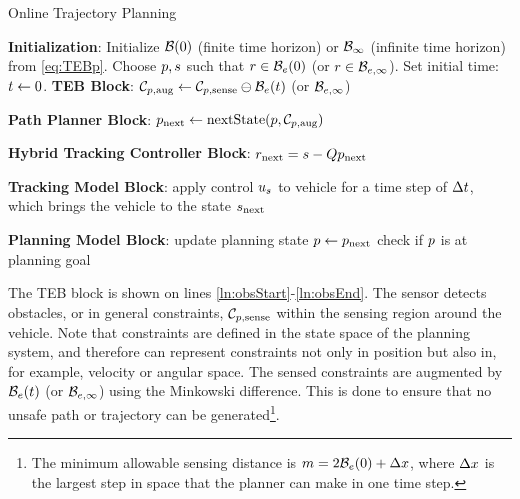 \begin{algorithm}	
	\caption{Online Trajectory Planning}
	\label{alg:algOnline}
	\begin{algorithmic}[1]
		\STATE \textbf{Initialization}: \label{ln:Istart}
 		\STATE Initialize $\mathcal B(0)$ (finite time horizon) or $\mathcal B_\infty$ (infinite time horizon) from \eqref{eq:TEBp}. 
		\STATE Choose $p, s$ such that $r \in  \mathcal B_e(0)$ (or $r\in\mathcal B_{e,\infty}$).
    \STATE Set initial time: $t \leftarrow 0$. \label{ln:Iend}
		\STATE \textbf{TEB Block}: \label{ln:obsStart}
		\STATE $\mathcal C_{p,\text{aug}} \leftarrow \mathcal C_{p,\text{sense}} \ominus \mathcal B_e(t)$ (or $\mathcal B_{e, \infty}$)\label{ln:obsEnd}
		
		\STATE \textbf{Path Planner Block}:\label{ln:plannerStart}
		\STATE $p_\text{next} \leftarrow \text{nextState}(p, \mathcal C_{p,\text{aug}})$\label{ln:plannerEnd}
		
		\STATE \textbf{Hybrid Tracking Controller Block}:\label{ln:controllerStart}
		\STATE $r_\text{next} = s - Qp_\text{next}$
		
		\ELSE {} 
           \ENDIF \label{ln:controllerEnd}
		
		\STATE \textbf{Tracking Model Block}: \label{ln:trackingStart}
		\STATE apply control $u_s$ to vehicle for a time step of $\Delta t$, which brings the vehicle to the state $s_\text{next}$ \label{ln:trackingEnd}
		
		\STATE \textbf{Planning Model Block}:\label{ln:planningStart}
		\STATE update planning state $p \leftarrow p_\text{next}$
		\STATE check if $p$ is at planning goal \label{ln:planningEnd}
		\ENDWHILE
	\end{algorithmic}
\end{algorithm}
The TEB block is shown on lines \ref{ln:obsStart}-\ref{ln:obsEnd}. 
The sensor detects obstacles, or in general constraints, $\mathcal C_{p,\text{sense}}$ within the sensing region around the vehicle.
Note that constraints are defined in the state space of the planning system, and therefore can represent constraints not only in position but also in, for example, velocity or angular space.
The sensed constraints are augmented by $\mathcal B_e(t)$ (or $\mathcal B_{e, \infty}$) using the Minkowski difference. 
This is done to ensure that no unsafe path or trajectory can be generated\footnote{The minimum allowable sensing distance is $m = 2\mathcal B_e(0) + \Delta x$, where $\Delta x$ is the largest step in space that the planner can make in one time step.}.

